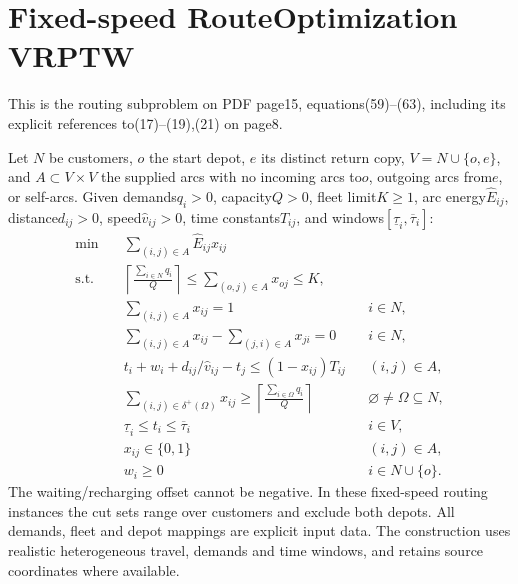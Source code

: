 \documentclass{article}
\begin{document}
\section*{Fixed-speed RouteOptimization VRPTW}
This is the routing subproblem on PDF page15, equations(59)--(63),
including its explicit references to(17)--(19),(21) on page8.

Let $N$ be customers, $o$ the start depot, $e$ its distinct return copy,
$V=N\cup\{o,e\}$, and $A\subset V\times V$ the supplied arcs with no
incoming arcs to$o$, outgoing arcs from$e$, or self-arcs.
Given demands$q_i>0$, capacity$Q>0$, fleet limit$K\ge1$,
arc energy$\widehat E_{ij}$, distance$d_{ij}>0$, speed$\widehat v_{ij}>0$,
time constants$T_{ij}$, and windows$[\underline\tau_i,\overline\tau_i]$:
\begin{align*}
\min\quad&\sum_{(i,j)\in A}\widehat E_{ij}x_{ij}\\
\text{s.t.}\quad&
\left\lceil\frac{\sum_{i\in N}q_i}{Q}\right\rceil
\le\sum_{(o,j)\in A}x_{oj}\le K,\\
&\sum_{(i,j)\in A}x_{ij}=1 &&i\in N,\\
&\sum_{(i,j)\in A}x_{ij}-\sum_{(j,i)\in A}x_{ji}=0 &&i\in N,\\
&t_i+w_i+d_{ij}/\widehat v_{ij}-t_j\le(1-x_{ij})T_{ij}&&(i,j)\in A,\\
&\sum_{(i,j)\in\delta^+(\Omega)}x_{ij}\ge
\left\lceil\frac{\sum_{i\in\Omega}q_i}{Q}\right\rceil
&&\varnothing\ne\Omega\subseteq N,\\
&\underline\tau_i\le t_i\le\overline\tau_i&&i\in V,\\
&x_{ij}\in\{0,1\}&&(i,j)\in A,\\
&w_i\ge0&&i\in N\cup\{o\}.
\end{align*}
The waiting/recharging offset cannot be negative. In these fixed-speed routing
instances the cut sets range over customers and exclude both depots. All demands, fleet and depot mappings are
explicit input data. The construction uses realistic heterogeneous travel,
demands and time windows, and retains source coordinates where available.
\end{document}
